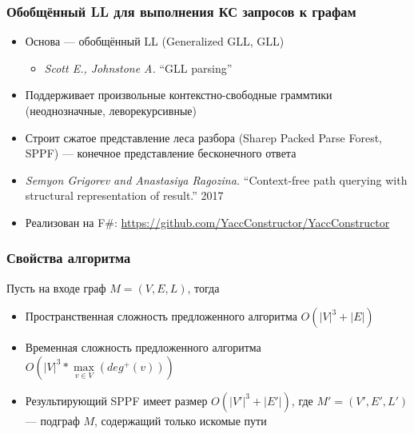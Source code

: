 \documentclass[xcolor=table,aspectratio=169]{beamer}
\begin{document}
\begin{frame}[fragile]
  \transwipe[direction=90]
  \frametitle{Обобщённый LL для выполнения КС запросов к графам}

\begin{itemize} 
\item Основа --- обобщённый LL (Generalized GLL, GLL)
\begin{itemize} 
  \item \emph{Scott E., Johnstone A.} ``GLL parsing''
\end{itemize}
\item Поддерживает произвольные контекстно-свободные граммтики (неоднозначные, леворекурсивные)
\item Строит сжатое представление леса разбора (Sharep Packed Parse Forest, SPPF) --- конечное представление бесконечного ответа
\item \emph{Semyon Grigorev and Anastasiya Ragozina.} ``Context-free path querying with structural representation of result.'' 2017
\item Реализован на F\#: \url{https://github.com/YaccConstructor/YaccConstructor}
\end{itemize}
\end{frame}


\begin{frame}
  \transwipe[direction=90]
  \frametitle{Свойства алгоритма}

Пусть на входе граф $M=(V,E,L)$, тогда
\begin{itemize} 
\item Пространственная сложность предложенного алгоритма $O(|V|^3 + |E|)$
\item Временная сложность предложенного алгоритма $O\left(|V|^3*\max\limits_{v \in V}\left(deg^+\left(v\right)\right)\right)$
\item Результирующий SPPF имеет размер $O(|V'|^3 + |E'|)$, где $M'=(V',E',L')$ --- подграф $M$, содержащий только искомые пути
\end{itemize}

\end{frame}
\end{document}
